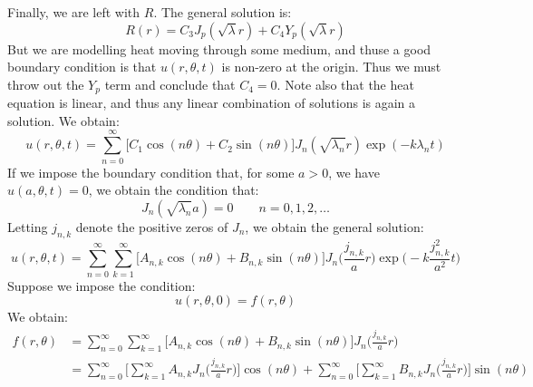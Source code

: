 \documentclass[crop=false,class=book,oneside]{standalone}
\begin{document}
            Finally, we are left with $R$. The general solution is:
            \begin{equation}
                R(r)=C_{3}J_{p}(\sqrt{\lambda}r)+
                C_{4}Y_{p}(\sqrt{\lambda}r)
            \end{equation}
            But we are modelling heat moving through some medium,
            and thuse a good boundary condition is that
            $u(r,\theta,t)$ is non-zero at the origin. Thus we
            must throw out the $Y_{p}$ term and conclude that
            $C_{4}=0$. Note also that the heat equation is linear,
            and thus any linear combination of solutions is again
            a solution. We obtain:
            \begin{equation}
                u(r,\theta,t)=\sum_{n=0}^{\infty}
                \big[C_{1}\cos(n\theta)+C_{2}\sin(n\theta)\big]
                J_{n}(\sqrt{\lambda_{n}}r)
                \exp(\minus{k}\lambda_{n}{t})
            \end{equation}
            If we impose the boundary condition that, for some
            $a>0$, we have $u(a,\theta,t)=0$, we obtain the
            condition that:
            \begin{equation}
                J_{n}(\sqrt{\lambda_{n}}a)=0
                \quad\quad
                n=0,1,2,\dots
            \end{equation}
            Letting $j_{n,k}$ denote the positive zeros of
            $J_{n}$, we obtain the general solution:
            \begin{equation}
                u(r,\theta,t)=
                \sum_{n=0}^{\infty}\sum_{k=1}^{\infty}
                    \big[A_{n,k}\cos(n\theta)+B_{n,k}\sin(n\theta)
                    \big]J_{n}\Big(\frac{j_{n,k}}{a}r\Big)
                    \exp\Big(\minus{k}\frac{j_{n,k}^{2}}{a^{2}}t\Big)
            \end{equation}
            Suppose we impose the condition:
            \begin{equation}
                u(r,\theta,0)=f(r,\theta)
            \end{equation}
            We obtain:
            \begin{subequations}
                \begin{align}
                    f(r,\theta)&=
                    \sum_{n=0}^{\infty}\sum_{k=1}^{\infty}
                    \big[A_{n,k}\cos(n\theta)+B_{n,k}\sin(n\theta)
                    \big]J_{n}\Big(\frac{j_{n,k}}{a}r\Big)\\
                    &=\sum_{n=0}^{\infty}\Big[\sum_{k=1}^{\infty}
                    A_{n,k}J_{n}\big(\frac{j_{n,k}}{a}r\big)\Big]
                    \cos(n\theta)+
                    \sum_{n=0}^{\infty}\Big[\sum_{k=1}^{\infty}
                    B_{n,k}J_{n}\big(\frac{j_{n,k}}{a}r\big)\Big]
                    \sin(n\theta)
                \end{align}
            \end{subequations}
\end{document}
